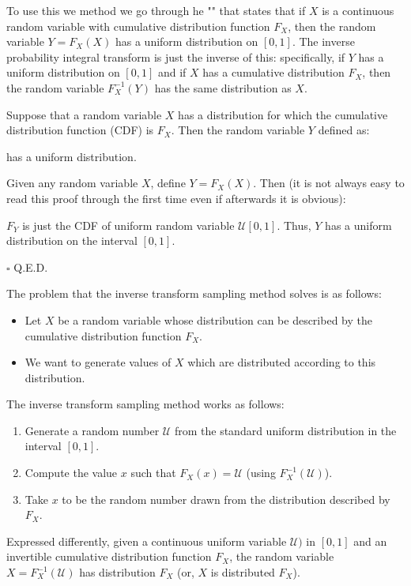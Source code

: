 	To use this we method we go through he "" that states that if $X$ is a continuous random variable with cumulative distribution function $F_X$, then the random variable $Y=F_X(X)$ has a uniform distribution on $[0, 1]$. The inverse probability integral transform is just the inverse of this: specifically, if $Y$ has a uniform distribution on $[0, 1]$ and if $X$ has a cumulative distribution $F_X$, then the random variable $F_X^{-1}(Y)$ has the same distribution as $X$.
	\begin{theorem}
	Suppose that a random variable $X$ has a distribution for which the cumulative distribution function (CDF) is $F_X$. Then the random variable $Y$ defined as:
	
	has a uniform distribution.
	\end{theorem}
	\begin{dem}
	Given any random variable $X$, define $Y = F_X (X)$. Then (it is not always easy to read this proof through the first time even if afterwards it is obvious):
	
	$F_Y$ is just the CDF of uniform random variable $\mathcal{U}[0,1]$. Thus, $Y$ has a uniform distribution on the interval $[0, 1]$.
	\begin{flushright}
		$\square$  Q.E.D.
	\end{flushright}
	\end{dem}
	The problem that the inverse transform sampling method solves is as follows:
	\begin{itemize}
		\item Let $X$ be a random variable whose distribution can be described by the cumulative distribution function $F_X$.
		\item We want to generate values of $X$ which are distributed according to this distribution.
	\end{itemize}
The inverse transform sampling method works as follows:
	\begin{enumerate}
		\item Generate a random number $\mathcal{U}$ from the standard uniform distribution in the interval $[0,1]$.
		\item Compute the value $x$ such that $F_X(x) =\mathcal{U}$ (using $F_X^{-1}(\mathcal{U})$).
		\item Take $x$ to be the random number drawn from the distribution described by $F_X$.
	\end{enumerate}
Expressed differently, given a continuous uniform variable $\mathcal{U})$ in $[0, 1]$ and an invertible cumulative distribution function $F_X$, the random variable $X = F_X^{-1}(\mathcal{U})$ has distribution $F_X$ (or, $X$ is distributed $F_X$).

